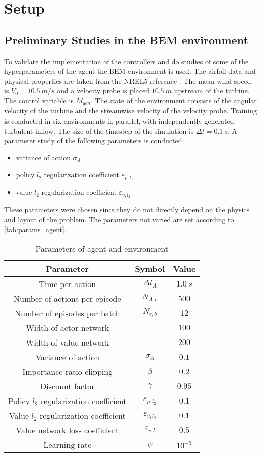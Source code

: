 \section{Setup}
\subsection{Preliminary Studies in the BEM environment}
To validate the implementation of the controllers and do studies of some of the hyperparameters of the agent the BEM environment is used. The airfoil data and physical properties are taken from the NREL5 reference \cite{jonkman_definition_2009}. The mean wind speed is $V_0=\SI{10.5}{m/s}$ and a velocity probe is placed $\SI{10.5}{m}$ upstream of the turbine.
The control variable is $M_{gen}$. The state of the environment consists of the angular velocity of the turbine and the streamwise velocity of the velocity probe. Training is conducted in six environments in parallel, with independently generated turbulent inflow. The size of the timestep of the simulation is $\Delta t = \SI{0.1}{s}$.
A parameter study of the following parameters is conducted:
\begin{itemize}
	\item variance of action $\sigma_A$
	\item policy $l_2$ regularization coefficient $\varepsilon_{p,l_2}$
	\item value $l_2$ regularization coefficient $\varepsilon_{v,l_2}$
\end{itemize}
These parameters were chosen since they do not directly depend on the physics and layout of the problem. The parameters not varied are set according to \autoref{tab:params_agent}.
\begin{table}[h]
	\centering
	\caption{Parameters of agent and environment}
	\begin{tabular}{ccc}
		\toprule
		Parameter & Symbol & Value \\
		\midrule
		Time per action & $\Delta t_A$ & $\SI{1.0}{s}$ \\ 
		Number of actions per episode & $N_{A,e}$ & $500$ \\
		Number of episodes per batch & $N_{e,b}$ & $12$ \\
		Width of actor network & & $100$ \\ 
		Width of value network & & $200$ \\ 
		Variance of action & $\sigma_A$ & $0.1$ \\ 
		Importance ratio clipping & $\beta$ & $0.2$ \\ 
		Discount factor & $\gamma$ & $0.95$ \\ 
		Policy $l_2$ regularization coefficient & $\varepsilon_{p,l_2} $ & $0.1$ \\ 
		Value $l_2$ regularization coefficient & $\varepsilon_{v,l_2}$ & $0.1$ \\ 
		Value network loss coefficient & $\varepsilon_{v,l}$ & $0.5$ \\ 
		Learning rate & $\psi$ & $10^{-3}$ \\
		\bottomrule
	\end{tabular}
	\label{tab:params_agent}
\end{table}
